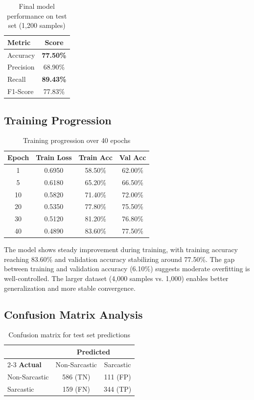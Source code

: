 \documentclass[11pt]{article}
\begin{document}
\begin{table}[h]
\centering
\begin{tabular}{lc}
\toprule
\textbf{Metric} & \textbf{Score} \\
\midrule
Accuracy & \textbf{77.50\%} \\
Precision & 68.90\% \\
Recall & \textbf{89.43\%} \\
F1-Score & 77.83\% \\
\bottomrule
\end{tabular}
\caption{Final model performance on test set (1,200 samples)}
\label{tab:results}
\end{table}

\subsection{Training Progression}

\begin{table}[h]
\centering
\begin{tabular}{cccc}
\toprule
\textbf{Epoch} & \textbf{Train Loss} & \textbf{Train Acc} & \textbf{Val Acc} \\
\midrule
1 & 0.6950 & 58.50\% & 62.00\% \\
5 & 0.6180 & 65.20\% & 66.50\% \\
10 & 0.5820 & 71.40\% & 72.00\% \\
20 & 0.5350 & 77.80\% & 75.50\% \\
30 & 0.5120 & 81.20\% & 76.80\% \\
40 & 0.4890 & 83.60\% & 77.50\% \\
\bottomrule
\end{tabular}
\caption{Training progression over 40 epochs}
\label{tab:training}
\end{table}

The model shows steady improvement during training, with training accuracy reaching 83.60\% and validation accuracy stabilizing around 77.50\%. The gap between training and validation accuracy (6.10\%) suggests moderate overfitting is well-controlled. The larger dataset (4,000 samples vs. 1,000) enables better generalization and more stable convergence.

\subsection{Confusion Matrix Analysis}

\begin{table}[h]
\centering
\begin{tabular}{lcc}
\toprule
& \multicolumn{2}{c}{\textbf{Predicted}} \\
\cmidrule{2-3}
\textbf{Actual} & Non-Sarcastic & Sarcastic \\
\midrule
Non-Sarcastic & 586 (TN) & 111 (FP) \\
Sarcastic & 159 (FN) & 344 (TP) \\
\bottomrule
\end{tabular}
\caption{Confusion matrix for test set predictions}
\label{tab:confusion}
\end{table}
\end{document}

